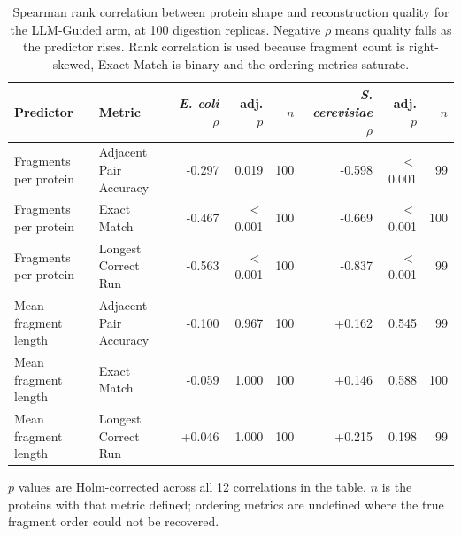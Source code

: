 \begin{table}[!t]
  \centering
  \caption{Spearman rank correlation between protein shape and reconstruction quality for the LLM-Guided arm, at 100 digestion replicas. Negative $\rho$ means quality falls as the predictor rises. Rank correlation is used because fragment count is right-skewed, Exact Match is binary and the ordering metrics saturate.}
  \label{tab:fragment_correlation}
  \begin{tabular}{llrrrrrr}
    \toprule
    Predictor & Metric & \textit{E. coli} $\rho$ & adj. $p$ & $n$ & \textit{S. cerevisiae} $\rho$ & adj. $p$ & $n$ \\
    \midrule
    Fragments per protein & Adjacent Pair Accuracy & -0.297 & 0.019 & 100 & -0.598 & $<$0.001 & 99 \\
    Fragments per protein & Exact Match & -0.467 & $<$0.001 & 100 & -0.669 & $<$0.001 & 100 \\
    Fragments per protein & Longest Correct Run & -0.563 & $<$0.001 & 100 & -0.837 & $<$0.001 & 99 \\
    Mean fragment length & Adjacent Pair Accuracy & -0.100 & 0.967 & 100 & +0.162 & 0.545 & 99 \\
    Mean fragment length & Exact Match & -0.059 & 1.000 & 100 & +0.146 & 0.588 & 100 \\
    Mean fragment length & Longest Correct Run & +0.046 & 1.000 & 100 & +0.215 & 0.198 & 99 \\
    \bottomrule
  \end{tabular}
  \par\smallskip\footnotesize{$p$ values are Holm-corrected across all 12 correlations in the table. $n$ is the proteins with that metric defined; ordering metrics are undefined where the true fragment order could not be recovered.}
\end{table}
